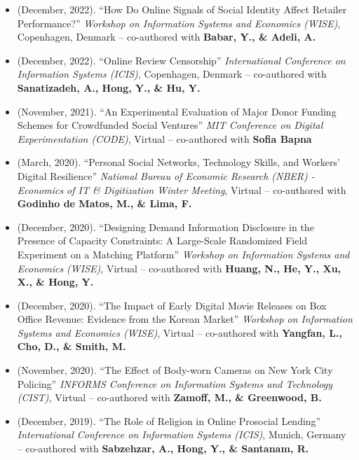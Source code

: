 \documentclass[10.5pt,letterpaper,sans]{moderncv}        %
\begin{document}
\begin{itemize}

\item (December, 2022). ``How Do Online Signals of Social Identity Affect Retailer Performance?'' \textit{Workshop on Information Systems and Economics (WISE)}, Copenhagen, Denmark -- co-authored with \textbf{Babar, Y., \& Adeli, A.} 

\item (December, 2022). ``Online Review Censorship'' \textit{International Conference on Information Systems (ICIS)}, Copenhagen, Denmark -- co-authored with \textbf{Sanatizadeh, A., Hong, Y., \& Hu, Y.} 

\item (November, 2021). ``An Experimental Evaluation of Major Donor Funding Schemes for Crowdfunded Social Ventures'' \textit{MIT Conference on Digital Experimentation (CODE)}, Virtual -- co-authored with \textbf{Sofia Bapna} 

\item (March, 2020). ``Personal Social Networks, Technology Skills, and Workers' Digital Resilience'' \textit{National Bureau of Economic Research (NBER) - Economics of IT \& Digitization Winter Meeting}, Virtual -- co-authored with \textbf{Godinho de Matos, M., \& Lima, F.} 

\item (December, 2020). ``Designing Demand Information Disclosure in the Presence of Capacity Constraints: A Large-Scale Randomized Field Experiment on a Matching Platform'' \textit{Workshop on Information Systems and Economics (WISE)}, Virtual -- co-authored with \textbf{Huang, N., He, Y., Xu, X., \& Hong, Y.} 

\item (December, 2020). ``The Impact of Early Digital Movie Releases on Box Office Revenue: Evidence from the Korean Market'' \textit{Workshop on Information Systems and Economics (WISE)}, Virtual -- co-authored with \textbf{Yangfan, L., Cho, D., \& Smith, M.} 

\item (November, 2020). ``The Effect of Body-worn Cameras on New York City Policing'' \textit{INFORMS Conference on Information Systems and Technology (CIST)}, Virtual -- co-authored with \textbf{Zamoff, M., \& Greenwood, B.} 

\item (December, 2019). ``The Role of Religion in Online Prosocial Lending'' \textit{International Conference on Information Systems (ICIS)}, Munich, Germany -- co-authored with \textbf{Sabzehzar, A., Hong, Y., \& Santanam, R.} 


\end{itemize}
\end{document}
